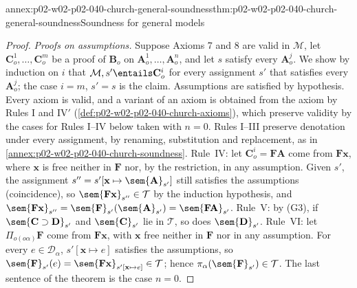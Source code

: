 \begin{annexitem}{annex:p02-w02-p02-040-church-general-soundness}{thm:p02-w02-p02-040-church-general-soundness}{Soundness for general models}
\begin{proof}
\emph{Proofs on assumptions.}  Suppose Axioms 7 and 8 are valid in
\(\mathcal M\), let \(\mathbf C^1_o,\ldots,\mathbf C^m_o\) be a proof of
\(\mathbf B_o\) on \(\mathbf A^1_o,\ldots,\mathbf A^n_o\), and let \(s\) satisfy
every \(\mathbf A^j_o\).  We show by induction on \(i\) that
\(\mathcal M,s'\entails\mathbf C^i_o\) for every assignment \(s'\) that satisfies
every \(\mathbf A^j_o\); the case \(i=m\), \(s'=s\) is the claim.  Assumptions
are satisfied by hypothesis.  Every axiom is valid, and a variant of an
axiom is obtained from the axiom by Rules I and IV\('\)
(\cref{def:p02-w02-p02-040-church-axioms}), which preserve validity by the
cases for Rules I--IV below taken with \(n=0\).  Rules I--III preserve
denotation under every assignment, by renaming, substitution and replacement,
as in \cref{annex:p02-w02-p02-040-church-soundness}.  Rule~IV: let
\(\mathbf C^i_o=\mathbf F\mathbf A\) come from \(\mathbf F\mathbf x\), where
\(\mathbf x\) is free neither in \(\mathbf F\) nor, by the restriction, in any
assumption.  Given \(s'\), the assignment
\(s''=s'[\mathbf x\mapsto\sem{\mathbf A}_{s'}]\) still satisfies the assumptions
(coincidence), so \(\sem{\mathbf F\mathbf x}_{s''}\in\mathcal T\) by the
induction hypothesis, and
\(\sem{\mathbf F\mathbf x}_{s''}=\sem{\mathbf F}_{s'}(\sem{\mathbf A}_{s'})=\sem{\mathbf F\mathbf A}_{s'}\).
Rule~V: by (G3), if \(\sem{\mathbf C\supset\mathbf D}_{s'}\) and
\(\sem{\mathbf C}_{s'}\) lie in \(\mathcal T\), so does \(\sem{\mathbf D}_{s'}\).
Rule~VI: let \(\Pi_{o(o\alpha)}\mathbf F\) come from \(\mathbf F\mathbf x\), with
\(\mathbf x\) free neither in \(\mathbf F\) nor in any assumption.  For every
\(e\in\mathcal D_\alpha\), \(s'[\mathbf x\mapsto e]\) satisfies the assumptions,
so \(\sem{\mathbf F}_{s'}(e)=\sem{\mathbf F\mathbf x}_{s'[\mathbf x\mapsto e]}\in\mathcal T\);
hence \(\pi_\alpha(\sem{\mathbf F}_{s'})\in\mathcal T\).  The last sentence of
the theorem is the case \(n=0\).
\end{proof}
\end{annexitem}

